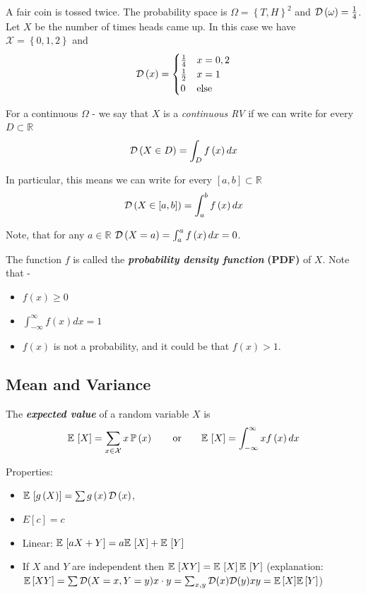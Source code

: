 \documentclass[11pt]{article}
\begin{document}
\begin{example}
A fair coin is tossed twice. The probability space  is $\Omega=\left\{ T,H\right\} ^{2}$
and $\mathcal{D}\left(\omega\right)=\frac{1}{4}$. Let $X$ be the number of
times heads came up. In this case we have $\mathcal{X}=\left\{ 0,1,2\right\} $
and
\[
\mathcal{D}\left(x\right)=\begin{cases}
\frac{1}{4} & x=0,2\\
\frac{1}{2} & x=1\\
0 & \mbox{else}
\end{cases}
\]

\end{example}
For a continuous $\Omega$ - we say that $X$ is a \textit{continuous
RV} if we can write for every $D\subset\mathbb{R}$ 
\[
\mathcal{D}\left(X\in D\right)=\int_{D}f\left(x\right)dx
\]


In particular, this means we can write for every $\left[a,b\right]\subset\mathbb{R}$
\[
\mathcal{D}\left(X\in\left[a,b\right]\right)=\int_{a}^{b}f\left(x\right)dx
\]


Note, that for any $a\in\mathbb{R}$ $\mathcal{D}\left(X=a\right)=\int_{a}^{a}f\left(x\right)dx=0$.

The function $f$ is called the \textbf{\textit{probability density
function }}\textbf{(PDF)} of $X$. Note that - 
\begin{itemize}
\item $f\left(x\right)\ge0$
\item $\int_{-\infty}^{\infty}f\left(x\right)dx=1$ 
\item $f\left(x\right)$ is not a probability, and it could be that $f\left(x\right)>1$.\\
\end{itemize}

\subsection{Mean and Variance}
\begin{definition}
The \textbf{\textit{expected value}} of a random variable
$X$ is
\[
\mathbb{E}\,\left[X\right]=\sum_{x\in\mathcal{X}}x\operatorname*{\mathbb{P}}\left(x\right)\qquad\mbox{or}\qquad \mathbb{E}\,\left[X\right]=\int_{-\infty}^{\infty}xf\left(x\right)dx
\]

\end{definition}
Properties:
\begin{itemize}
\item $\mathbb{E}\,\left[g\left(X\right)\right]=\sum g\left(x\right)\mathcal{D}\left(x\right)$,
\item $E\left[c\right]=c$
\item Linear: $\mathbb{E}\,\left[aX+Y\right]=a\mathbb{E}\,\left[X\right]+\mathbb{E}\,\left[Y\right]$
\item If $X$ and $Y$ are independent then $\mathbb{E}\,\left[XY\right]=\mathbb{E}\,\left[X\right]\mathbb{E}\,\left[Y\right]$
(explanation: $\mathbb{E}\,[XY]=\sum\mathcal{D}(X=x,Y=y)x\cdot y = \sum_{x,y}\mathcal{D}(x)\mathcal{D}(y)xy=\mathbb{E}\,[X]\mathbb{E}\,[Y]$)
\end{itemize}
\end{document}
